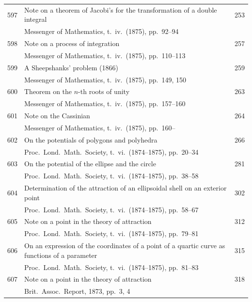 \documentclass[12pt,a4paper]{article}
\theoremstyle{plain}
\theoremstyle{definition}
\begin{document}
\begin{longtable}{r @{. } p{4.8in} r}
597 & Note on a theorem of Jacobi's for the transformation of a double integral & 253 \\
  & Messenger of Mathematics, t.\ iv.\ (1875), pp.\ 92--94 & \\ 

598 & Note on a process of integration & 257 \\
  & Messenger of Mathematics, t.\ iv.\ (1875), pp.\ 110--113 & \\ 

599 & A Sheepshanks' problem (1866) & 259 \\
  & Messenger of Mathematics, t.\ iv.\ (1875), pp.\ 149, 150 & \\ 

600 & Theorem on the $n$-th roots of unity & 263 \\
  & Messenger of Mathematics, t.\ iv.\ (1875), pp.\ 157--160 & \\ 

601 & Note on the Cassinian & 264 \\
  & Messenger of Mathematics, t.\ iv.\ (1875), pp.\ 160-- & \\ 

602 & On the potentials of polygons and polyhedra & 266 \\
  & Proc.\ Lond.\ Math.\ Society, t.\ vi.\ (1874--1875), pp.\ 20--34 & \\ 

603 & On the potential of the ellipse and the circle & 281 \\
  & Proc.\ Lond.\ Math.\ Society, t.\ vi.\ (1874--1875), pp.\ 38--58 & \\ 

604 & Determination of the attraction of an ellipsoidal shell on an exterior point & 302 \\
  & Proc.\ Lond.\ Math.\ Society, t.\ vi.\ (1874--1875), pp.\ 58--67 & \\ 

605 & Note on a point in the theory of attraction & 312 \\
  & Proc.\ Lond.\ Math.\ Society, t.\ vi.\ (1874--1875), pp.\ 79--81 & \\ 

606 & On an expression of the coordinates of a point of a quartic curve as functions of a parameter & 315 \\
  & Proc.\ Lond.\ Math.\ Society, t.\ vi.\ (1874--1875), pp.\ 81--83 & \\ 

607 & Note on a point in the theory of attraction & 318 \\
  & Brit.\ Assoc.\ Report, 1873, pp.\ 3, 4 & \\ 


\end{longtable}
\end{document}
